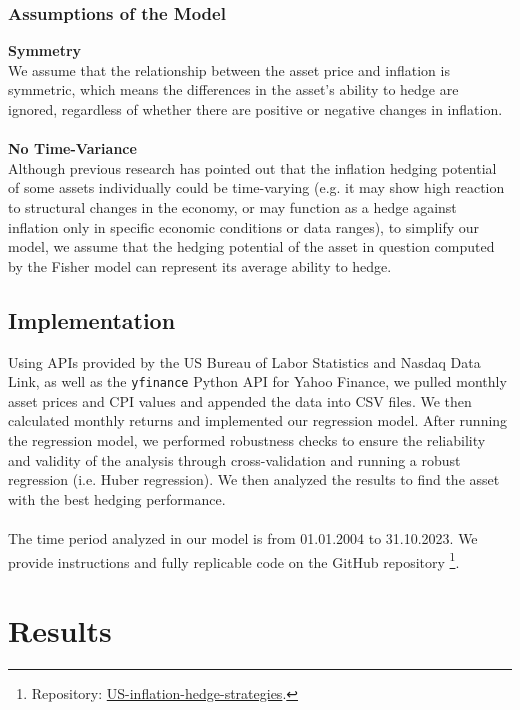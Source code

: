 \documentclass{article}
\begin{document}
\subsubsection{Assumptions of the Model}
\noindent
\textbf{Symmetry} \\
\indent
We assume that the relationship between the asset price and inflation is symmetric, which means the differences in the asset's ability to hedge are ignored, regardless of whether there are positive or negative changes in inflation.\\~\\
\textbf{No Time-Variance} \\
\indent 
Although previous research has pointed out that the inflation hedging potential of some assets individually could be time-varying (e.g. it may show high reaction to structural changes in the economy, or may function as a hedge against inflation only in specific economic conditions or data ranges), to simplify our model, we assume that the hedging potential of the asset in question computed by the Fisher model can represent its average ability to hedge.

\subsection{Implementation}
Using APIs provided by the US Bureau of Labor Statistics and Nasdaq Data Link, as well as the \verb|yfinance| Python API for Yahoo Finance, we pulled monthly asset prices and CPI values and appended the data into CSV files. We then calculated monthly returns and implemented our regression model. After running the regression model, we performed robustness checks to ensure the reliability and validity of the analysis through cross-validation and running a robust regression (i.e. Huber regression). We then analyzed the results to find the asset with the best hedging performance.
\\~\\
The time period analyzed in our model is from 01.01.2004 to 31.10.2023. We provide instructions and fully replicable code on the GitHub repository \footnote{Repository: {\href{https://github.com/dianayjin/US-inflation-hedge-strategies}{US-inflation-hedge-strategies}}.}.

\section{Results}
\end{document}
